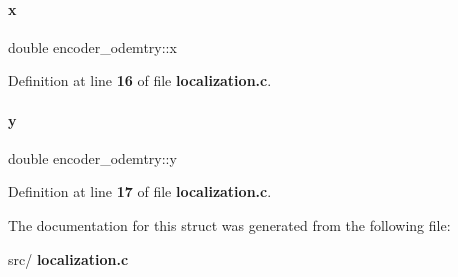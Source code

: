 \paragraph{x}
{\footnotesize\ttfamily double encoder\+\_\+odemtry\+::x}



Definition at line \textbf{ 16} of file \textbf{ localization.\+c}.

\mbox{\label{structencoder__odemtry_a955cbea800158b8c0cd5f36b253fe6bb}} 
\paragraph{y}
{\footnotesize\ttfamily double encoder\+\_\+odemtry\+::y}



Definition at line \textbf{ 17} of file \textbf{ localization.\+c}.



The documentation for this struct was generated from the following file\+:\begin{DoxyCompactItemize}
\item 
src/\textbf{ localization.\+c}\end{DoxyCompactItemize}
